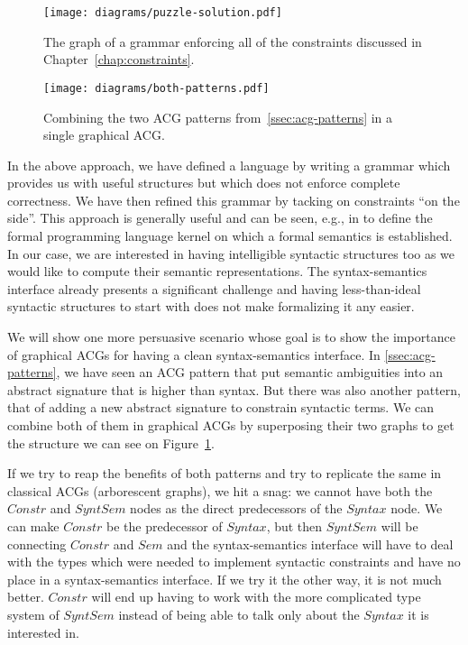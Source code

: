 \begin{figure}[t]
  \centering
  \begin{minipage}[b]{0.4\textwidth}
    \centering
    \texttt{[image: diagrams/puzzle-solution.pdf]}
    \caption{{\label{fig:puzzle-solution} The graph of a grammar
        enforcing all of the constraints discussed in
        Chapter~\ref{chap:constraints}.}}
  \end{minipage}
  \qquad
  \begin{minipage}[b]{0.4\textwidth}
    \centering
    \texttt{[image: diagrams/both-patterns.pdf]}
    \caption{{\label{fig:both-patterns} Combining the two ACG patterns
        from~\ref{ssec:acg-patterns} in a single graphical ACG.}}
  \end{minipage}
\end{figure}

In the above approach, we have defined a language by writing a grammar
which provides us with useful structures but which does not enforce
complete correctness. We have then refined this grammar by tacking on
constraints ``on the side''. This approach is generally useful and can
be seen, e.g., in \cite{van2004concepts} to define the formal
programming language kernel on which a formal semantics is
established. In our case, we are interested in having intelligible
syntactic structures too as we would like to compute their semantic
representations. The syntax-semantics interface already presents a
significant challenge and having less-than-ideal syntactic structures to
start with does not make formalizing it any easier.

We will show one more persuasive scenario whose goal is to show the
importance of graphical ACGs for having a clean syntax-semantics
interface. In \ref{ssec:acg-patterns}, we have seen an ACG pattern that
put semantic ambiguities into an abstract signature that is higher than
syntax. But there was also another pattern, that of adding a new
abstract signature to constrain syntactic terms. We can combine both of
them in graphical ACGs by superposing their two graphs to get the
structure we can see on Figure~\ref{fig:both-patterns}.

If we try to reap the benefits of both patterns and try to replicate the
same in classical ACGs (arborescent graphs), we hit a snag: we cannot
have both the $Constr$ and $SyntSem$ nodes as the direct predecessors of
the $Syntax$ node. We can make $Constr$ be the predecessor of $Syntax$,
but then $SyntSem$ will be connecting $Constr$ and $Sem$ and the
syntax-semantics interface will have to deal with the types which were
needed to implement syntactic constraints and have no place in a
syntax-semantics interface. If we try it the other way, it is not much
better. $Constr$ will end up having to work with the more complicated
type system of $SyntSem$ instead of being able to talk only about the
$Syntax$ it is interested in.

